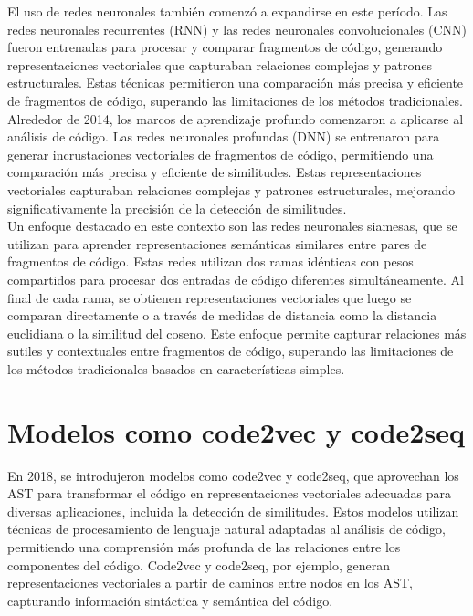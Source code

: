 El uso de redes neuronales también comenzó a expandirse en este período. Las redes neuronales recurrentes (RNN) y las redes neuronales convolucionales (CNN) fueron entrenadas para procesar y comparar fragmentos de código, generando representaciones vectoriales que capturaban relaciones complejas y patrones estructurales. Estas técnicas permitieron una comparación más precisa y eficiente de fragmentos de código, superando las limitaciones de los métodos tradicionales. \\

Alrededor de 2014, los marcos de aprendizaje profundo comenzaron a aplicarse al análisis de código. Las redes neuronales profundas (DNN) se entrenaron para generar incrustaciones vectoriales de fragmentos de código, permitiendo una comparación más precisa y eficiente de similitudes. Estas representaciones vectoriales capturaban relaciones complejas y patrones estructurales, mejorando significativamente la precisión de la detección de similitudes. \\

Un enfoque destacado en este contexto son las redes neuronales siamesas, que se utilizan para aprender representaciones semánticas similares entre pares de fragmentos de código. Estas redes utilizan dos ramas idénticas con pesos compartidos para procesar dos entradas de código diferentes simultáneamente. Al final de cada rama, se obtienen representaciones vectoriales que luego se comparan directamente o a través de medidas de distancia como la distancia euclidiana o la similitud del coseno. Este enfoque permite capturar relaciones más sutiles y contextuales entre fragmentos de código, superando las limitaciones de los métodos tradicionales basados en características simples.


\section*{\textbf{Modelos como code2vec y code2seq}}
En 2018, se introdujeron modelos como code2vec y code2seq, que aprovechan los AST para transformar el código en representaciones vectoriales adecuadas para diversas aplicaciones, incluida la detección de similitudes. Estos modelos utilizan técnicas de procesamiento de lenguaje natural adaptadas al análisis de código, permitiendo una comprensión más profunda de las relaciones entre los componentes del código. Code2vec y code2seq, por ejemplo, generan representaciones vectoriales a partir de caminos entre nodos en los AST, capturando información sintáctica y semántica del código.

